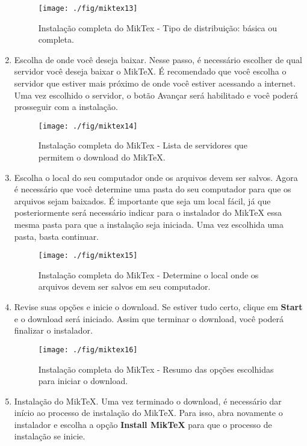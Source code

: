 \begin{enumerate}
\begin{figure}[H]
  \centering
  \texttt{[image: ./fig/miktex13]}
  \caption[Tipo de distribuição: básica ou completa]{Instalação completa do MikTex - Tipo de distribuição: básica ou completa.}
\end{figure}
\item Escolha de onde você deseja baixar.
Nesse passo, é necessário escolher de qual servidor você deseja baixar o MikTeX. É recomendado que você escolha o servidor que estiver mais próximo de onde você estiver acessando a internet. Uma vez escolhido o servidor, o botão Avançar será habilitado e você poderá prosseguir com a instalação.
\begin{figure}[H]
  \centering
  \texttt{[image: ./fig/miktex14]}
  \caption[Lista de servidores que permitem o download do MikTeX]{Instalação completa do MikTex - Lista de servidores que permitem o download do MikTeX.\hspace{\linewidth}}
\end{figure}
\item Escolha o local do seu computador onde os arquivos devem ser salvos.
Agora é necessário que você determine uma pasta do seu computador para que os arquivos sejam baixados. É importante que seja um local fácil, já que posteriormente será necessário indicar para o instalador do MikTeX essa mesma pasta para que a instalação seja iniciada. Uma vez escolhida uma pasta, basta continuar.
\begin{figure}[H]
  \centering
  \texttt{[image: ./fig/miktex15]}
  \caption[Determine o local onde os arquivos devem ser salvos]{Instalação completa do MikTex - Determine o local onde os arquivos devem ser salvos em seu computador.}
\end{figure}
\item Revise suas opções e inicie o download.
Se estiver tudo certo, clique em \textbf{Start} e o download será iniciado. Assim que terminar o download, você poderá finalizar o instalador.
\begin{figure}[H]
  \centering
  \texttt{[image: ./fig/miktex16]}
  \caption[Resumo das opções escolhidas para iniciar o download]{Instalação completa do MikTex - Resumo das opções escolhidas para iniciar o download.}
\end{figure}
\item Instalação do MikTeX.
Uma vez terminado o download, é necessário dar início ao processo de instalação do MikTeX. Para isso, abra novamente o instalador e escolha a opção \textbf{Install MikTeX} para que o processo de instalação se inicie.

\end{enumerate}
